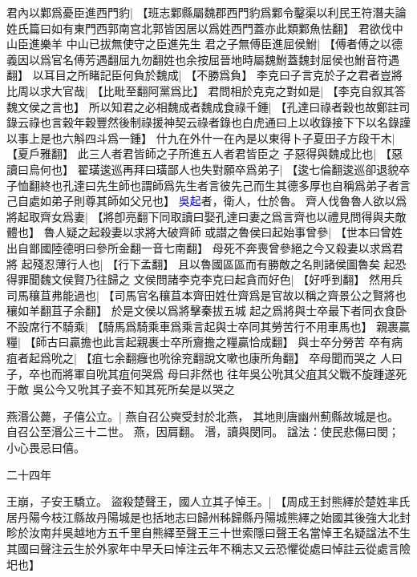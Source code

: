 君內以鄴爲憂臣進西門豹|{
	【班志鄴縣屬魏郡西門豹爲鄴令鑿渠以利民王符潛夫論姓氏篇曰如有東門西郭南宫北郭皆因居以爲姓西門蓋亦此類鄴魚怯翻】
	}
君欲伐中山臣進樂羊
中山已拔無使守之臣進先生
君之子無傅臣進屈侯鮒|{
	【傅者傅之以德義因以爲官名傅芳遇翻屈九勿翻姓也余按屈晉地時屬魏鮒蓋魏封屈侯也鮒音符遇翻】
	}
以耳目之所睹記臣何負於魏成|{
	【不勝爲負】}
李克曰子言克於子之君者豈將比周以求大官哉|{
	【比毗至翻阿黨爲比】
	}
君問相於克克之對如是|{
	【李克自叙其答魏文侯之言也】}
所以知君之必相魏成者魏成食祿千鍾|{
	【孔達曰祿者穀也故鄭註司錄云祿也言穀年穀豐然後制祿援神契云祿者錄也白虎通曰上以收錄接下下以名錄謹以事上是也六斛四斗爲一鍾】
	}
什九在外什一在內是以東得卜子夏田子方段干木|{
	【夏戶雅翻】}
此三人者君皆師之子所進五人者君皆臣之
子惡得與魏成比也|{
	【惡讀曰烏何也】
	}
翟璜逡巡再拜曰璜鄙人也失對願卒爲弟子|{
	【逡七倫翻逡巡卻退貌卒子恤翻終也孔達曰先生師也謂師爲先生者言彼先己而生其德多厚也自稱爲弟子者言己自處如弟子則尊其師如父兄也】
	}
\textcolor{blue}{吳起}者，衛人，仕於魯。
齊人伐魯魯人欲以爲將起取齊女爲妻|{
	【將卽亮翻下同取讀曰娶孔達曰妻之爲言齊也以禮見問得與夫敵體也】
	}
魯人疑之起殺妻以求將大破齊師
或譛之魯侯曰起始事曾參|{
	【世本曰曾姓出自鄫國陸德明曰參所金翻一音七南翻】
	}
母死不奔喪曾參絕之今又殺妻以求爲君將
起殘忍薄行人也|{
	【行下孟翻】
	}
且以魯國區區而有勝敵之名則諸侯圖魯矣
起恐得罪聞魏文侯賢乃往歸之
文侯問諸李克李克曰起貪而好色|{
	【好呼到翻】}
然用兵司馬穰苴弗能過也|{
	【司馬官名穰苴本齊田姓仕齊爲是官故以稱之齊景公之賢將也穰如羊翻苴子余翻】
	}
於是文侯以爲將擊秦拔五城
起之爲將與士卒最下者同衣食卧不設席行不騎乘|{
	【騎馬爲騎乘車爲乘言起與士卒同其勞苦行不用車馬也】}
親裹贏糧|{
	【師古曰贏擔也此言起親裹士卒所齎擔之糧贏恰成翻】}
與士卒分勞苦
卒有病疽者起爲吮之|{
	【疽七余翻癰也吮徐兖翻說文嗽也康所角翻】}
卒母聞而哭之
人曰子，卒也而將軍自吮其疽何哭爲
母曰非然也
往年吳公吮其父疽其父戰不旋踵遂死于敵
吳公今又吮其子妾不知其死所矣是以哭之

燕湣公薨，子僖公立。|{
	燕自召公奭受封於北燕，
	其地則唐幽州薊縣故城是也。
	自召公至湣公三十二世。
	燕，因肩翻。
	湣，讀與閔同。
	諡法：使民悲傷曰閔；
	小心畏忌曰僖。
	}


二十四年

王崩，子安王驕立。
盜殺楚聲王，國人立其子悼王。|{
	【周成王封熊繹於楚姓芈氏居丹陽今枝江縣故丹陽城是也括地志曰歸州秭歸縣丹陽城熊繹之始國其後強大北封畛於汝南幷吳越地方五千里自熊繹至聲王三十世索隱曰聲王名當悼王名疑諡法不生其國曰聲注云生於外家年中早夭曰悼注云年不稱志又云恐懼從處曰悼註云從處言險圯也】}
\par
